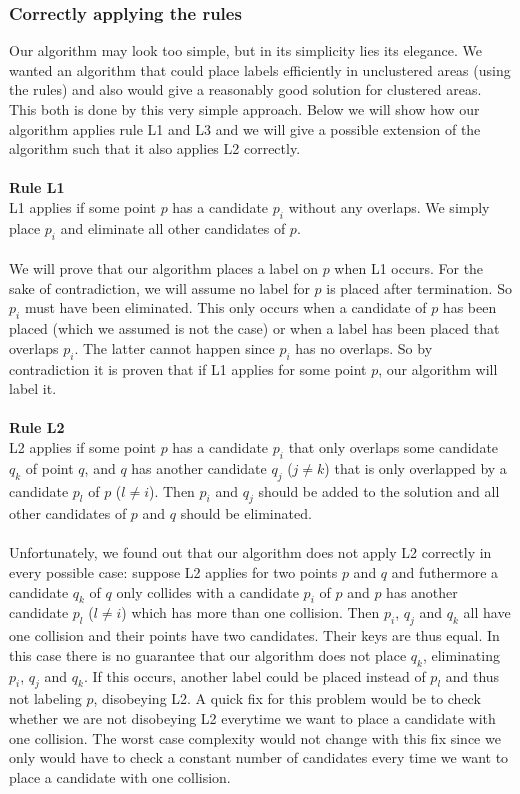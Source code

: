\documentclass[crop=false,a4paper,oneside,11pt]{article}
\begin{document}
\subsubsection{Correctly applying the rules}
Our algorithm may look too simple, but in its simplicity lies its elegance. We wanted an algorithm that could place labels efficiently in unclustered areas (using the rules) and also would give a reasonably good solution for clustered areas. This both is done by this very simple approach. Below we will show how our algorithm applies rule L1 and L3 and we will give a possible extension of the algorithm such that it also applies L2 correctly.\\
\\
\textbf{Rule L1}\\
L1 applies if some point $p$ has a candidate $p_i$ without any overlaps. We simply place $p_i$ and eliminate all other candidates of $p$.\\
\\
We will prove that our algorithm places a label on $p$ when L1 occurs. For the sake of contradiction, we will assume no label for $p$ is placed after termination. So $p_i$ must have been eliminated. This only occurs when a candidate of $p$ has been placed (which we assumed is not the case) or when a label has been placed that overlaps $p_i$. The latter cannot happen since $p_i$ has no overlaps. So by contradiction it is proven that if L1 applies for some point $p$, our algorithm will label it.\\
\\
\textbf{Rule L2}\\
L2 applies if some point $p$ has a candidate $p_i$ that only overlaps some candidate $q_k$ of point $q$, and $q$ has another
candidate $q_j$ ($j \neq k$) that is only overlapped by a candidate $p_l$ of $p$ ($l \neq i$). Then $p_i$
and $q_j$ should be added to the solution and all other candidates of $p$ and $q$ should be eliminated.\\
\\
Unfortunately, we found out that our algorithm does not apply L2 correctly in every possible case: suppose L2 applies for two points $p$ and $q$ and futhermore a candidate $q_k$ of $q$ only collides with a candidate $p_i$ of $p$ and $p$ has another candidate $p_l$ ($l\neq i$) which has more than one collision. Then $p_i$, $q_j$ and $q_k$ all have one collision and their points have two candidates. Their keys are thus equal. In this case there is no guarantee that our algorithm does not place $q_k$, eliminating $p_i$, $q_j$ and $q_k$. If this occurs, another label could be placed instead of $p_l$ and thus not labeling $p$, disobeying L2. A quick fix for this problem would be to check whether we are not disobeying L2 everytime we want to place a candidate with one collision. The worst case complexity would not change with this fix since we only would have to check a constant number of candidates every time we want to place a candidate with one collision.\\
\end{document}
